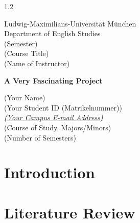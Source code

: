 \documentclass[12pt]{article}
\begin{document}

\begin{titlepage}
    \begin{spacing}{1.2}
    \begin{flushleft}
        Ludwig-Maximilians-Universität München\\
        Department of English Studies\\
        (Semester)\\
        (Course Title)\\
        (Name of Instructor)
    \end{flushleft}
    
    \vspace*{\fill}
    
    \begin{center}
        \textbf{\LARGE A Very Fascinating Project}
    \end{center}
    
    \vspace*{\fill}
    
    \begin{center}
        (Your Name)\\
        (Your Student ID (Matrikelnummer))\\
        \textit{\href{mailto:your.email@example.com}{(Your Campus E-mail Address)}}\\
        (Course of Study, Majors/Minors)\\
        (Number of Semesters)
    \end{center}
    \end{spacing}
\end{titlepage}

\newpage
\renewcommand{\contentsname}{Table of Contents}
\tableofcontents

\clearpage
\captionsetup[figure]{list=yes}
\listoffigures
\clearpage

\clearpage
\captionsetup[table]{list=yes} 
\listoftables
\clearpage


\clearpage
{}

\section{Introduction}
\lipsum[1]



\section{Literature Review}
\lipsum[2]
\end{document}
